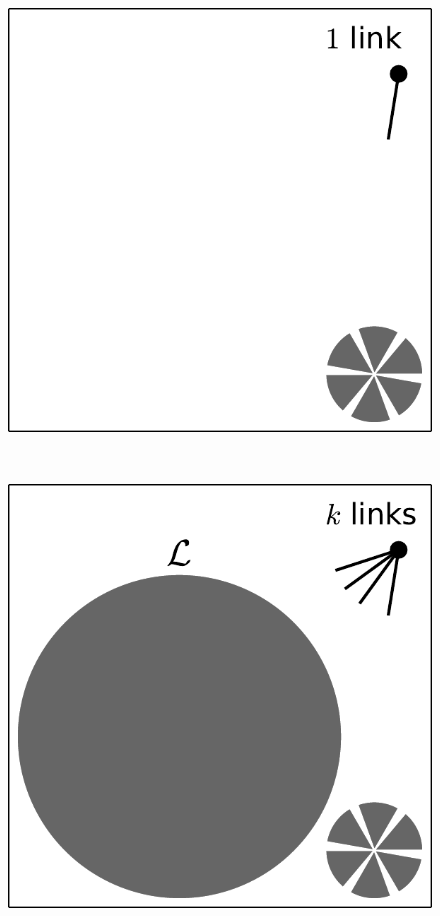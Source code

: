 \documentclass[aps, pre, onecolumn, a4paper, floatfix]{revtex4}
\begin{document}
\begin{figure}[htb]
\begin{minipage}[b]{0.05\linewidth}
\begin{center}
    \end{center}
  \end{minipage}
  \begin{minipage}[b]{0.18\linewidth}
    \begin{center}
      \includegraphics[width=0.99\columnwidth]{sets_gc_no1.pdf}
    \end{center}
  \end{minipage}
  \begin{minipage}[b]{0.05\linewidth}
  \ 
  \end{minipage}
  \begin{minipage}[b]{0.18\linewidth}
    \begin{center}
      \includegraphics[width=0.99\columnwidth]{sets_gc_allk.pdf}

\end{center}
\end{minipage}
\end{figure}
\end{document}
